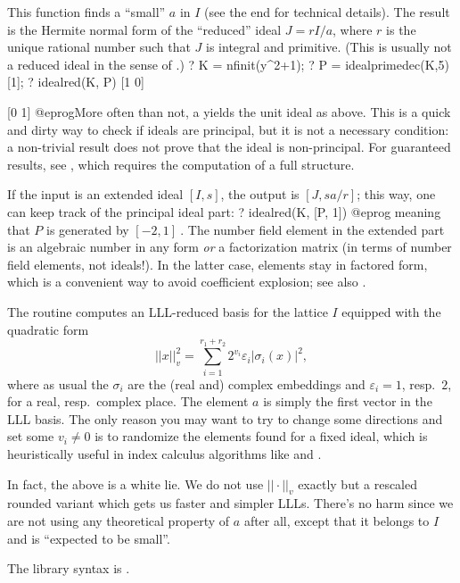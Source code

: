 This function finds a ``small'' $a$ in $I$ (see the end for technical details).
The result is the Hermite normal form of
the ``reduced'' ideal $J = r I/a$, where $r$ is the unique rational number such
that $J$ is integral and primitive. (This is usually not a reduced ideal in
the sense of .)
\bprog
? K = nfinit(y^2+1);
? P = idealprimedec(K,5)[1];
? idealred(K, P)
[1 0]

[0 1]
@eprog\noindent More often than not, a  yields the unit
ideal as above. This is a quick and dirty way to check if ideals are principal,
but it is not a necessary condition: a non-trivial result does not prove that
the ideal is non-principal. For guaranteed results, see ,
which requires the computation of a full  structure.

If the input is an extended ideal $[I,s]$, the output is $[J,sa/r]$; this way,
one can keep track of the principal ideal part:
\bprog
? idealred(K, [P, 1])
@eprog\noindent
meaning that $P$ is generated by $[-2, 1]~$. The number field element in the
extended part is an algebraic number in any form \emph{or} a factorization
matrix (in terms of number field elements, not ideals!). In the latter case,
elements stay in factored form, which is a convenient way to avoid
coefficient explosion; see also .

 The routine computes an LLL-reduced
basis for the lattice $I$ equipped with the quadratic form
$$|| x ||_v^2 = \sum_{i=1}^{r_1+r_2} 2^{v_i}\varepsilon_i|\sigma_i(x)|^2,$$
where as usual the $\sigma_i$ are the (real and) complex embeddings and
$\varepsilon_i = 1$, resp.~$2$, for a real, resp.~complex place. The element
$a$ is simply the first vector in the LLL basis. The only reason you may want
to try to change some directions and set some $v_i\neq 0$ is to randomize
the elements found for a fixed ideal, which is heuristically useful in index
calculus algorithms like  and .

 In fact, the above is a white lie.
We do not use $||\cdot||_v$ exactly but a rescaled rounded variant which
gets us faster and simpler LLLs. There's no harm since we are not using any
theoretical property of $a$ after all, except that it belongs to $I$ and is
``expected to be small''.

The library syntax is .

